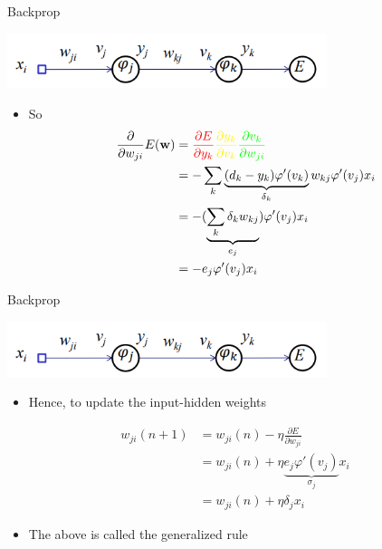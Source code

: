 \documentclass[notes]{beamer}
\providecommand{\tightlist}{%
  \setlength{\itemsep}{0pt}\setlength{\parskip}{0pt}}
\begin{document}
\begin{frame}{Backprop}

\centering 

\includegraphics[width=0.70000\textwidth]{2018-03-10-13-49-42.png}\\

\begin{itemize}
\tightlist
\item
  So\\

  \begin{align}
  \frac{\partial }{\partial w_{ji}} E(\vw) &= 
    \textcolor{red}{
        \frac{\partial E}{\partial y_k}} 
    \textcolor{yellow}{
        \frac{\partial y_k}{\partial v_k}
    } 
    \textcolor{green}{
        \frac{\partial v_k}{\partial w_{ji}}
    } \\
    &=  - \sum_{k} \underbrace{(d_k - y_k) \varphi ' (v_k) }_{\delta_k} w_{kj} \varphi ' (v_j) x_i  \\
    & = -(\underbrace{\sum_k \delta_k w_{kj}}_{e_j}) \varphi ' (v_j) x_i \\ 
    &= -e_j \varphi ' (v_j )x_i
  \end{align}
\end{itemize}

\end{frame}

\begin{frame}{Backprop}

\centering 

\includegraphics[width=0.70000\textwidth]{2018-03-10-13-49-42.png}\\

\begin{itemize}
\tightlist
\item
  Hence, to update the input-hidden weights
\end{itemize}

\begin{align}
    w_{ji} (n+1 ) & = w_{ji} (n) - \eta \frac{\partial E}{\partial w_{ji}} \\
    &= w_{ji} (n) + \eta \underbrace{ e_j \varphi ' (v_j)  }_{\sigma_j} x_i  \\ 
    &= w_{ji}(n) + \eta \delta_j x_i   
\end{align}

\begin{itemize}
\tightlist
\item
  The above is called the generalized rule
\end{itemize}

\end{frame}
\end{document}
